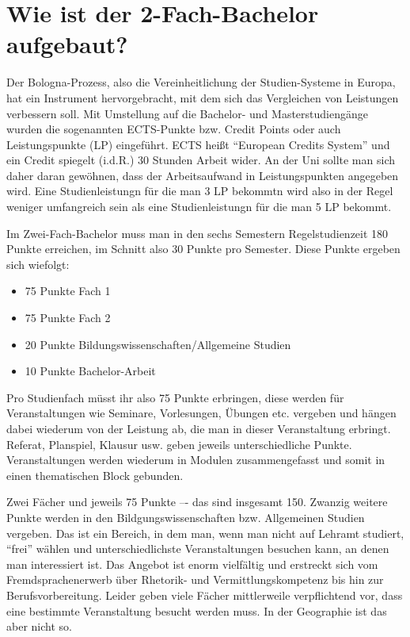\section*{Wie ist der 2-Fach-Bachelor aufgebaut?}
Der Bologna-Prozess, also die Vereinheitlichung der Studien-Systeme in Europa, hat ein Instrument hervorgebracht, mit dem sich das Vergleichen von Leistungen verbessern soll. Mit Umstellung auf die Bachelor- und Masterstudiengänge wurden die sogenannten ECTS-Punkte bzw. Credit Points oder auch Leistungspunkte (LP) eingeführt. ECTS heißt "`European Credits System"' und ein Credit spiegelt (i.d.R.) 30 Stunden Arbeit wider. An der Uni sollte man sich daher daran gewöhnen, dass der Arbeitsaufwand in Leistungspunkten angegeben wird. Eine Studienleistungn für die man 3 LP bekommtn wird also in der Regel weniger umfangreich sein als eine Studienleistungn für die man 5 LP bekommt.

Im Zwei-Fach-Bachelor muss man in den sechs Semestern Regelstudienzeit 180 Punkte erreichen, im Schnitt also 30 Punkte pro Semester. Diese Punkte ergeben sich wiefolgt:
\begin{itemize}
\item 75 Punkte Fach 1
\item 75 Punkte Fach 2
\item 20 Punkte Bildungswissenschaften/Allgemeine Studien
\item 10 Punkte Bachelor-Arbeit
\end{itemize}
Pro Studienfach müsst ihr also 75 Punkte erbringen, diese werden für Veranstaltungen wie Seminare, Vorlesungen, Übungen etc. vergeben und hängen dabei wiederum von der Leistung ab, die man in dieser Veranstaltung erbringt. Referat, Planspiel, Klausur usw. geben jeweils unterschiedliche Punkte. Veranstaltungen werden wiederum in Modulen zusammengefasst und somit in einen thematischen Block gebunden.

Zwei Fächer und jeweils 75 Punkte –- das sind insgesamt 150. Zwanzig weitere Punkte werden in den Bildgungswissenschaften bzw. Allgemeinen Studien vergeben. Das ist ein Bereich, in dem man, wenn man nicht auf Lehramt studiert, "`frei"' wählen und unterschiedlichste Veranstaltungen besuchen kann, an denen man interessiert ist. Das Angebot ist enorm vielfältig und erstreckt sich vom Fremdsprachenerwerb über Rhetorik- und Vermittlungskompetenz bis hin zur Berufsvorbereitung. Leider geben viele Fächer mittlerweile verpflichtend vor, dass eine bestimmte Veranstaltung besucht werden muss. In der Geographie ist das aber nicht so.

